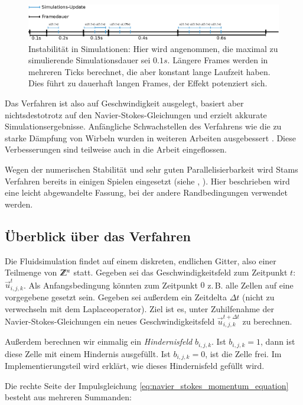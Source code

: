 \begin{figure}[ht]
\includegraphics[width=12cm]{images/simulation_blowup}
\caption{Instabilität in Simulationen: Hier wird angenommen, die maximal zu simulierende Simulationsdauer sei $0.1s$. Längere Frames werden in mehreren Ticks berechnet, die aber konstant lange Laufzeit haben. Dies führt zu dauerhaft langen Frames, der Effekt potenziert sich.}
\end{figure}

Das Verfahren ist also auf Geschwindigkeit ausgelegt, basiert aber
nichtsdestotrotz auf den Navier-Stokes-Gleichungen und erzielt akkurate
Simulationsergebnisse. Anfängliche Schwachstellen des Verfahrens wie die zu
starke Dämpfung von Wirbeln wurden in weiteren Arbeiten ausgebessert
\cite{Foster}. Diese Verbesserungen sind teilweise auch in die Arbeit
eingeflossen.

Wegen der numerischen Stabilität und sehr guten Parallelisierbarkeit wird Stams
Verfahren bereits in einigen Spielen eingesetzt (siehe \cite{Crane2007},
\cite{Peschel2009}). Hier beschrieben wird eine leicht abgewandelte
Fassung, bei der andere Randbedingungen verwendet werden.

\subsection{Überblick über das Verfahren}

Die Fluidsimulation findet auf einem diskreten, endlichen Gitter, also einer
Teilmenge von $\mathbb{Z}^n$ statt. Gegeben sei das Geschwindigkeitsfeld zum
Zeitpunkt $t$: $\vec{u}_{i,j,k}^t$. Als Anfangsbedingung könnten zum Zeitpunkt $0$
z.\,B. alle Zellen auf eine vorgegebene  gesetzt sein.
Gegeben sei außerdem ein Zeitdelta $\Delta t$ (nicht zu verwechseln mit dem
Laplaceoperator). Ziel ist es, unter Zuhilfenahme der
Navier-Stokes-Gleichungen ein neues Geschwindigkeitsfeld $\vec{u}_{i,j,k}^{t+\Delta
t}$ zu berechnen.

Außerdem berechnen wir einmalig ein \emph{Hindernisfeld} $b_{i,j,k}$. Ist $b_{i,j,k}
= 1$, dann ist diese Zelle mit einem Hindernis ausgefüllt. Ist $b_{i,j,k} = 0$,
ist die Zelle frei. Im Implementierungsteil wird erklärt, wie dieses
Hindernisfeld gefüllt wird.

Die rechte Seite der Impulsgleichung \eqref{eq:navier_stokes_momentum_equation} besteht
aus mehreren Summanden:

